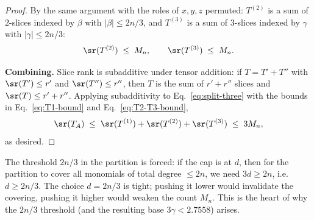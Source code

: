 \begin{proof}
By the same argument with the roles of $x, y, z$ permuted: $T^{(2)}$ is a sum of $2$-slices indexed by $\beta$ with $|\beta| \le 2n/3$, and $T^{(3)}$ is a sum of $3$-slices indexed by $\gamma$ with $|\gamma| \le 2n/3$:
\begin{align}\label{eq:T2-T3-bound}
\sr(T^{(2)}) \;\le\; M_n, \qquad \sr(T^{(3)}) \;\le\; M_n.
\end{align}

\textbf{Combining.} Slice rank is subadditive under tensor addition: if $T = T' + T''$ with $\sr(T') \le r'$ and $\sr(T'') \le r''$, then $T$ is the sum of $r' + r''$ slices and $\sr(T) \le r' + r''$. Applying subadditivity to Eq.~\eqref{eq:split-three} with the bounds in Eq.~\eqref{eq:T1-bound} and Eq.~\eqref{eq:T2-T3-bound},
\begin{align*}
\sr(T_A) \;\le\; \sr(T^{(1)}) + \sr(T^{(2)}) + \sr(T^{(3)}) \;\le\; 3 M_n,
\end{align*}
as desired.
\end{proof}

\begin{remark}\label{rem:degree-threshold}
The threshold $2n/3$ in the partition is forced: if the cap is at $d$, then for the partition to cover all monomials of total degree $\le 2n$, we need $3d \ge 2n$, i.e.\ $d \ge 2n/3$. The choice $d = 2n/3$ is tight; pushing it lower would invalidate the covering, pushing it higher would weaken the count $M_n$. This is the heart of why the $2n/3$ threshold (and the resulting base $3\gamma < 2.7558$) arises.
\end{remark}
